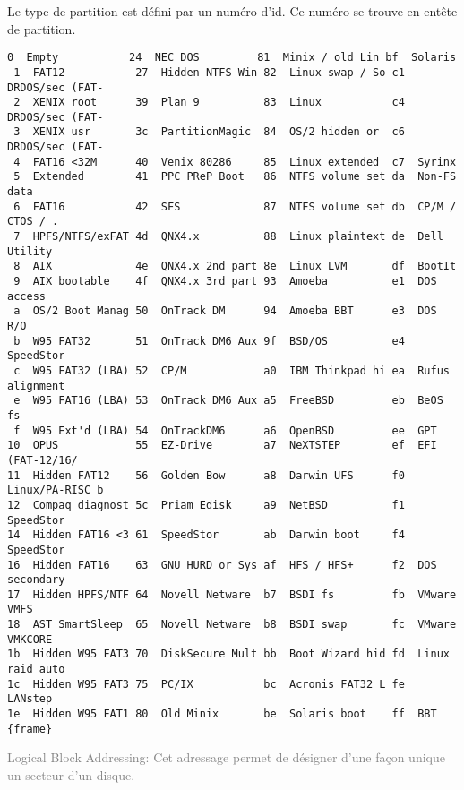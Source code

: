 \documentclass[compress]{beamer}
\begin{document}
\begin{frame}[fragile]
Le type de partition est défini par un numéro d'id.\newline
Ce numéro se trouve en entête de partition.
\begin{lstlisting}[basicstyle=\tiny\ttfamily\color{white}]
 0  Empty           24  NEC DOS         81  Minix / old Lin bf  Solaris        
 1  FAT12           27  Hidden NTFS Win 82  Linux swap / So c1  DRDOS/sec (FAT-
 2  XENIX root      39  Plan 9          83  Linux           c4  DRDOS/sec (FAT-
 3  XENIX usr       3c  PartitionMagic  84  OS/2 hidden or  c6  DRDOS/sec (FAT-
 4  FAT16 <32M      40  Venix 80286     85  Linux extended  c7  Syrinx         
 5  Extended        41  PPC PReP Boot   86  NTFS volume set da  Non-FS data    
 6  FAT16           42  SFS             87  NTFS volume set db  CP/M / CTOS / .
 7  HPFS/NTFS/exFAT 4d  QNX4.x          88  Linux plaintext de  Dell Utility   
 8  AIX             4e  QNX4.x 2nd part 8e  Linux LVM       df  BootIt         
 9  AIX bootable    4f  QNX4.x 3rd part 93  Amoeba          e1  DOS access     
 a  OS/2 Boot Manag 50  OnTrack DM      94  Amoeba BBT      e3  DOS R/O        
 b  W95 FAT32       51  OnTrack DM6 Aux 9f  BSD/OS          e4  SpeedStor      
 c  W95 FAT32 (LBA) 52  CP/M            a0  IBM Thinkpad hi ea  Rufus alignment
 e  W95 FAT16 (LBA) 53  OnTrack DM6 Aux a5  FreeBSD         eb  BeOS fs        
 f  W95 Ext'd (LBA) 54  OnTrackDM6      a6  OpenBSD         ee  GPT            
10  OPUS            55  EZ-Drive        a7  NeXTSTEP        ef  EFI (FAT-12/16/
11  Hidden FAT12    56  Golden Bow      a8  Darwin UFS      f0  Linux/PA-RISC b
12  Compaq diagnost 5c  Priam Edisk     a9  NetBSD          f1  SpeedStor      
14  Hidden FAT16 <3 61  SpeedStor       ab  Darwin boot     f4  SpeedStor      
16  Hidden FAT16    63  GNU HURD or Sys af  HFS / HFS+      f2  DOS secondary  
17  Hidden HPFS/NTF 64  Novell Netware  b7  BSDI fs         fb  VMware VMFS    
18  AST SmartSleep  65  Novell Netware  b8  BSDI swap       fc  VMware VMKCORE 
1b  Hidden W95 FAT3 70  DiskSecure Mult bb  Boot Wizard hid fd  Linux raid auto
1c  Hidden W95 FAT3 75  PC/IX           bc  Acronis FAT32 L fe  LANstep        
1e  Hidden W95 FAT1 80  Old Minix       be  Solaris boot    ff  BBT {frame}
\end{lstlisting}
\textcolor{gray}{\tiny{Logical Block Addressing: Cet adressage permet de désigner d’une façon unique un secteur d’un disque.}}
\end{frame}


\end{document}
